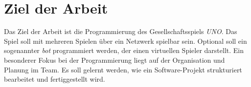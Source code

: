 
\chapter{Ziel der Arbeit }

Das Ziel der Arbeit ist die Programmierung des Gesellschaftsspiels \textit{UNO}. Das Spiel soll mit mehreren Spielen über ein Netzwerk spielbar sein. Optional soll ein sogenannter \textit{bot} programmiert werden, der einen virtuellen Spieler darstellt. Ein besonderer Fokus bei der Programmierung liegt auf der Organisation und Planung im Team. Es soll gelernt werden, wie ein Software-Projekt strukturiert bearbeitet und fertiggestellt wird. 